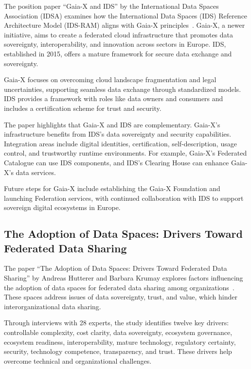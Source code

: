 The position paper ``Gaia-X and IDS'' by the International Data Spaces Association (IDSA) examines how the International Data Spaces (IDS) Reference Architecture Model (IDS-RAM) aligns with Gaia-X principles~\cite{gaiax_and_ids}.
Gaia-X, a newer initiative, aims to create a federated cloud infrastructure that promotes data sovereignty, interoperability, and innovation across sectors in Europe.
IDS, established in 2015, offers a mature framework for secure data exchange and sovereignty.

Gaia-X focuses on overcoming cloud landscape fragmentation and legal uncertainties, supporting seamless data exchange through standardized models.
IDS provides a framework with roles like data owners and consumers and includes a certification scheme for trust and security.

The paper highlights that Gaia-X and IDS are complementary.
Gaia-X's infrastructure benefits from IDS's data sovereignty and security capabilities.
Integration areas include digital identities, certification, self-description, usage control, and trustworthy runtime environments.
For example, Gaia-X's Federated Catalogue can use IDS components, and IDS's Clearing House can enhance Gaia-X's data services.

Future steps for Gaia-X include establishing the Gaia-X Foundation and launching Federation services, with continued collaboration with IDS to support sovereign digital ecosystems in Europe.

\subsection{The Adoption of Data Spaces: Drivers Toward Federated Data Sharing}\label{subsec:the-adoption-of-data-spaces:-drivers-toward-federated-data-sharing}

The paper ``The Adoption of Data Spaces: Drivers Toward Federated Data Sharing'' by Andreas Hutterer and Barbara Krumay explores factors influencing the adoption of data spaces for federated data sharing among organizations~\cite{adoption_of_data_spaces}.
These spaces address issues of data sovereignty, trust, and value, which hinder interorganizational data sharing.

Through interviews with 28 experts, the study identifies twelve key drivers: controllable complexity, cost clarity, data sovereignty, ecosystem governance, ecosystem readiness, interoperability, mature technology, regulatory certainty, security, technology competence, transparency, and trust.
These drivers help overcome technical and organizational challenges.

